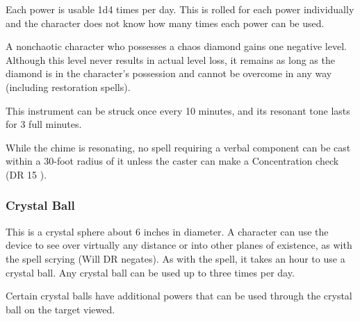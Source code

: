 {Each power is usable 1d4 times per day. This is rolled for each power individually and the character does not know how many times each power can be used.

A nonchaotic character who possesses a chaos diamond gains one negative level. Although this level never results in actual level loss, it remains as long as the diamond is in the character's possession and cannot be overcome in any way (including restoration spells).


 This instrument can be struck once every 10 minutes, and its resonant tone lasts for 3 full minutes.

While the chime is resonating, no spell requiring a verbal component can be cast within a 30-foot radius of it unless the caster can make a Concentration check (DR 15 \add {}).


\subsubsection{Crystal Ball} This is a crystal sphere about 6 inches in diameter. A character can use the device to see over virtually any distance or into other planes of existence, as with the spell scrying (Will DR  negates). As with the  spell, it takes an hour to use a crystal ball. Any crystal ball can be used up to three times per day.

Certain crystal balls have additional powers that can be used through the crystal ball on the target viewed.

}
